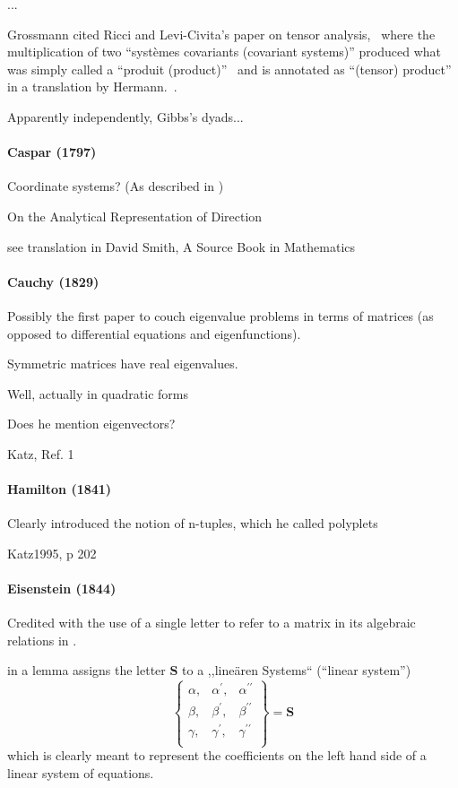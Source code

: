 ...

Grossmann cited Ricci and Levi-Civita's paper on tensor analysis,~\cite{Ricci1900} where the multiplication of two ``systèmes covariants (covariant systems)'' produced what was simply called a ``produit (product)''~\cite[p. 133]{Ricci1900} and is annotated as ``(tensor) product'' in a translation by Hermann.~\cite[p. 28]{Hermann1975}.

Apparently independently, Gibbs's dyads...



\paragraph{Caspar (1797)}

Coordinate systems? (As described in \cite{Katz1995})

On the Analytical Representation of Direction

see translation in David Smith, A Source Book in Mathematics

\paragraph{Cauchy (1829)}

Possibly the first paper to couch eigenvalue problems in terms of matrices (as
opposed to differential equations and eigenfunctions).

Symmetric matrices have real eigenvalues.

Well, actually in quadratic forms

Does he mention eigenvectors?

Katz, Ref. 1

\paragraph{Hamilton (1841)}

Clearly introduced the notion of n-tuples, which he called polyplets


Katz1995, p 202



\paragraph{Eisenstein (1844)~\cite{Eisenstein1844}}

Credited with the use of a single letter to refer to a matrix in its algebraic relations in \cite{Dorier1995}.

\cite[p. 327]{Eisenstein1844} in a lemma assigns the letter $\boldsymbol S$ to a ,,lineären Systems``
(``linear system'')
\[
\begin{Bmatrix}
\alpha, & \alpha^\prime, & \alpha^{\prime\prime} \\
\beta, & \beta^\prime, & \beta^{\prime\prime} \\
\gamma, & \gamma^\prime, & \gamma^{\prime\prime} \\
\end{Bmatrix} = \boldsymbol S
\]
which is clearly meant to represent the coefficients on the left hand side of a
linear system of equations.

